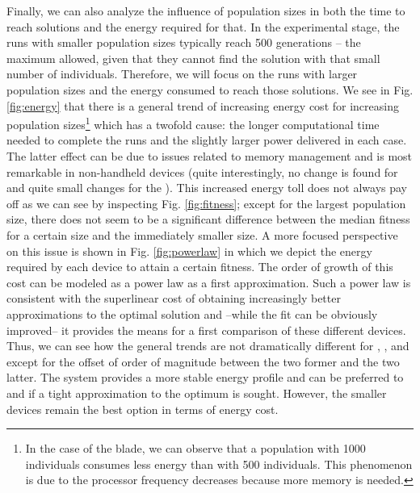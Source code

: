 Finally, we can also analyze %
 the influence of population sizes in both
the time to reach solutions and the energy required for that.  In the
experimental stage, the runs with smaller population sizes typically
reach 500 generations -- the maximum allowed, given that they cannot
find the solution with that small number of individuals. %
 Therefore,
we will focus on the runs with larger population sizes and the energy
consumed to reach those solutions.  We see in Fig. \ref{fig:energy}
that there is a general trend of increasing energy cost for increasing
population sizes\footnote{In the case of the blade, we can observe that a population with 1000 individuals consumes less energy than with 500 individuals. This phenomenon is due to the processor frequency decreases because more memory is needed.} which has a
twofold cause: the longer computational time needed to complete the
runs and the slightly larger power delivered in each case. The latter
effect can be due to issues related to memory management %
and is most
remarkable in non-handheld devices (quite interestingly, no change is
found for \raspberry and quite small changes for the \tabletnsp). This
increased energy toll does not always pay off as we can see by
inspecting Fig. \ref{fig:fitness}; except for the largest population
size, there does not seem to be a significant difference between the
median fitness for a certain size and the immediately smaller size. A
more focused perspective on this issue is shown in
Fig. \ref{fig:powerlaw} in which we depict the energy required by each
device to attain a certain fitness. The order of growth of this cost
can be modeled as a power law as a first approximation. Such a power
law is consistent with the superlinear cost of obtaining increasingly
better approximations to the optimal solution and --while the fit can
be obviously improved-- it provides the means for a first comparison
of these different devices. Thus, we can see how the general trends
are not dramatically different for  \raspberrynsp, \tabletnsp, \laptop
and \iMac except for the offset of order of magnitude between the two
former and the two latter. The \blade system provides a more stable
energy profile and can be preferred to \laptop and \iMac if a tight
approximation to the optimum is sought. However, the smaller devices
remain the best option in terms of energy cost. 


